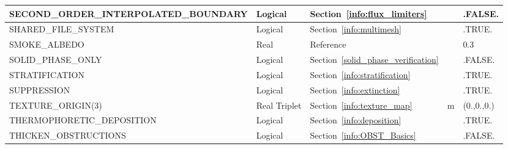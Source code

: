 \documentclass[11pt]{book}
\begin{document}
\begin{longtable}{@{\extracolsep{\fill}}|l|l|l|l|l|}
{\ct SECOND\_ORDER\_INTERPOLATED\_BOUNDARY}     & Logical       & Section~\ref{info:flux_limiters}                      &               & {\ct .FALSE.}     \\ \hline
{\ct SHARED\_FILE\_SYSTEM}                      & Logical       & Section~\ref{info:multimesh}                          &               & {\ct .TRUE.}      \\ \hline
{\ct SMOKE\_ALBEDO}                             & Real          & Reference~\cite{Smokeview_Users_Guide}                &               & 0.3               \\ \hline
{\ct SOLID\_PHASE\_ONLY}                        & Logical       & Section~\ref{solid_phase_verification}                &               & {\ct .FALSE.}     \\ \hline
{\ct STRATIFICATION}                            & Logical       & Section~\ref{info:stratification}                     &               & {\ct .TRUE.}      \\ \hline
{\ct SUPPRESSION}                               & Logical       & Section~\ref{info:extinction}                         &               & {\ct .TRUE.}      \\ \hline
{\ct TEXTURE\_ORIGIN(3)}                        & Real Triplet  & Section~\ref{info:texture_map}                        & m             & (0.,0.,0.)        \\ \hline
{\ct THERMOPHORETIC\_DEPOSITION}                & Logical       & Section~\ref{info:deposition}                         &               & {\ct .TRUE.}      \\ \hline
{\ct THICKEN\_OBSTRUCTIONS}                     & Logical       & Section~\ref{info:OBST_Basics}                        &               & {\ct .FALSE.}     \\ \hline

\end{longtable}
\end{document}
